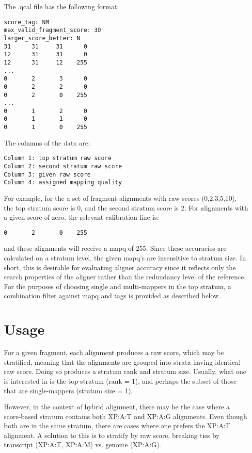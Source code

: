 \documentclass[10pt]{article}
\begin{document}
The .qcal file has the following format:

{\small
\begin{verbatim}
score_tag: NM
max_valid_fragment_score: 30
larger_score_better: N
31      31     31      0
12      31     31      0
12      31     12    255
...
0       2       3      0
0       2       2      0
0       2       0    255
...
0       1       2      0
0       1       1      0
0       1       0    255
\end{verbatim}
}

The columns of the data are:

{\small
\begin{verbatim}
Column 1: top stratum raw score
Column 2: second stratum raw score
Column 3: given raw score
Column 4: assigned mapping quality
\end{verbatim}
}

For example, for the a set of fragment alignments with raw scores
(0,2,3,5,10), the top stratum score is 0, and the second stratum score
is 2. For alignments with a given score of zero, the relevant
calibration line is:

{\small \verb!0       2       0    255!}

and these alignments will receive a mapq of 255. Since these
accuracies are calculated on a stratum level, the given mapq's are
insensitive to stratum size. In short, this is desirable for
evaluating aligner accuracy since it reflects only the search
properties of the aligner rather than the redundancy level of the
reference. For the purposes of choosing single and multi-mappers in
the top stratum, a combination filter against mapq and tags is
provided as described below.

\section*{Usage}

For a given fragment, each alignment produces a raw score, which may
be stratified, meaning that the alignments are grouped into strata
having identical raw score.  Doing so produces a stratum rank and
stratum size. Usually, what one is interested in is the top-stratum
(rank = 1), and perhaps the subset of those that are single-mappers
(stratum size = 1).

However, in the context of hybrid alignment, there may be the case
where a score-based stratum contains both XP:A:T and XP:A:G
alignments. Even though both are in the same stratum, there are cases
where one prefers the XP:A:T alignment. A solution to this is to
stratify by raw score, breaking ties by transcript (XP:A:T, XP:A:M)
vs. genome (XP:A:G).
\end{document}
